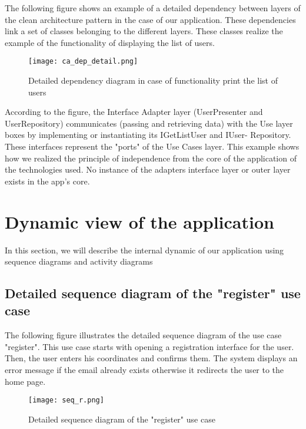 The following figure shows an example of a detailed dependency between
layers of the clean architecture pattern in the case of our application. These dependencies link a set of classes belonging to the different layers.
These classes realize the example of the functionality of displaying the list of
users.
\begin{figure}[H]%
    \center   
    \texttt{[image: ca\_dep\_detail.png]}
    \caption{Detailed dependency diagram in case of functionality
print the list of users}
\end{figure}
According to the figure, the Interface Adapter layer (UserPresenter and UserRepository)
communicates (passing and retrieving data) with the Use layer
boxes by implementing or instantiating its IGetListUser and IUser-
Repository. These interfaces represent the "ports" of the Use Cases layer.
This example shows how we realized the principle of independence
from the core of the application of the technologies used. No instance of the
adapters interface layer or outer layer exists in the app's core.
\section{Dynamic view of the application}
In this section, we will describe the internal dynamic of our application using sequence diagrams and activity diagrams
\subsection{Detailed sequence diagram of the "register" use case}
The following figure illustrates the detailed sequence diagram of the use case
"register".
This use case starts with opening a registration interface
for the user. Then, the user enters his coordinates and confirms them.
The system displays an error message if the email already exists otherwise it redirects
the user to the home page. 
\begin{figure}[H]%
    \center   
    \texttt{[image: seq\_r.png]}
    \caption{Detailed sequence diagram of the "register" use case}
\end{figure}
